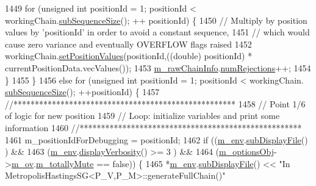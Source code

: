 \begin{DoxyCode}
1449     \textcolor{keywordflow}{for} (\textcolor{keywordtype}{unsigned} \textcolor{keywordtype}{int} positionId = 1; positionId < workingChain.\hyperlink{class_q_u_e_s_o_1_1_base_vector_sequence_afd6278702d40bdf1044697bbd6ad1957}{subSequenceSize}(); ++
      positionId) \{
1450       \textcolor{comment}{// Multiply by position values by 'positionId' in order to avoid a constant sequence,}
1451       \textcolor{comment}{// which would cause zero variance and eventually OVERFLOW flags raised}
1452       workingChain.\hyperlink{class_q_u_e_s_o_1_1_base_vector_sequence_a5bcce98b68e0e24c05136e7a3bb50c12}{setPositionValues}(positionId,((\textcolor{keywordtype}{double}) positionId) * 
      currentPositionData.vecValues());
1453       \hyperlink{class_q_u_e_s_o_1_1_metropolis_hastings_s_g_ac531509489028853bb17c0353fc9eafd}{m\_rawChainInfo}.\hyperlink{struct_q_u_e_s_o_1_1_m_h_raw_chain_info_struct_a276f608de19910713df01124a971c79c}{numRejections}++;
1454     \}
1455   \}
1456   \textcolor{keywordflow}{else} \textcolor{keywordflow}{for} (\textcolor{keywordtype}{unsigned} \textcolor{keywordtype}{int} positionId = 1; positionId < workingChain.
      \hyperlink{class_q_u_e_s_o_1_1_base_vector_sequence_afd6278702d40bdf1044697bbd6ad1957}{subSequenceSize}(); ++positionId) \{
1457     \textcolor{comment}{//****************************************************}
1458     \textcolor{comment}{// Point 1/6 of logic for new position}
1459     \textcolor{comment}{// Loop: initialize variables and print some information}
1460     \textcolor{comment}{//****************************************************}
1461     m\_positionIdForDebugging = positionId;
1462     \textcolor{keywordflow}{if} ((\hyperlink{class_q_u_e_s_o_1_1_metropolis_hastings_s_g_ac8ea061e55b920e0c8f9bce5c3f20e52}{m\_env}.\hyperlink{class_q_u_e_s_o_1_1_base_environment_a8a0064746ae8dddfece4229b9ad374d6}{subDisplayFile}()                   ) &&
1463         (\hyperlink{class_q_u_e_s_o_1_1_metropolis_hastings_s_g_ac8ea061e55b920e0c8f9bce5c3f20e52}{m\_env}.\hyperlink{class_q_u_e_s_o_1_1_base_environment_a1fe5f244fc0316a0ab3e37463f108b96}{displayVerbosity}() >= 3            ) &&
1464         (\hyperlink{class_q_u_e_s_o_1_1_metropolis_hastings_s_g_a5d0bc9f73d50d272aa6bfb5ef5939ef3}{m\_optionsObj}->\hyperlink{class_q_u_e_s_o_1_1_metropolis_hastings_s_g_options_a9d4792d9fc2dc5439b8ab489b0c236eb}{m\_ov}.\hyperlink{class_q_u_e_s_o_1_1_mh_options_values_af812309e81191e88dfdc87c5815141a3}{m\_totallyMute} == \textcolor{keyword}{false})) \{
1465       *\hyperlink{class_q_u_e_s_o_1_1_metropolis_hastings_s_g_ac8ea061e55b920e0c8f9bce5c3f20e52}{m\_env}.\hyperlink{class_q_u_e_s_o_1_1_base_environment_a8a0064746ae8dddfece4229b9ad374d6}{subDisplayFile}() << \textcolor{stringliteral}{"In MetropolisHastingsSG<P\_V,P\_M>::generateFullChain()"}

\end{DoxyCode}
